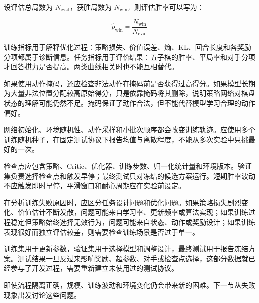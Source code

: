 \documentclass[UTF8,a4paper,zihao=-4,oneside,openany]{ctexbook}
\begin{document}
设评估总局数为 $N_{\mathrm{eval}}$，获胜局数为 $N_{\mathrm{win}}$，则评估胜率可以写为：

\begin{equation}
\widehat{p}_{\mathrm{win}}
=
\frac{
N_{\mathrm{win}}
}{
N_{\mathrm{eval}}
}
\end{equation}

训练指标用于解释优化过程：策略损失、价值误差、熵、KL、回合长度和各奖励分项都属于诊断信息。任务指标用于评价结果：五子棋的胜率、平局率和对手分项才回答棋力是否提高。两类曲线相关时也不能互相替代。

如果使用动作掩码，还应检查非法动作在掩码前是否获得过高得分。如果模型长期为大量非法位置分配较高原始得分，只是依靠掩码将其删除，说明策略网络对棋盘状态的理解可能仍然不足。掩码保证了动作合法，但不能代替模型学习合理的动作偏好。

网络初始化、环境随机性、动作采样和小批次顺序都会改变训练轨迹。应使用多个训练随机种子，在固定测试协议下报告均值与离散程度，不能从多次实验中只挑最好的一次。

检查点应包含策略、Critic、优化器、训练步数、归一化统计量和环境版本。验证集负责选择检查点和触发早停；最终测试只对冻结的候选方案运行。短期胜率波动不应触发即时早停，平滑窗口和耐心周期应在实验前设定。

在分析训练失败原因时，应区分任务设计问题和优化问题。如果策略损失剧烈变化、价值估计不断发散，问题可能来自学习率、更新频率或算法实现；如果训练过程稳定但策略始终选择无效行为，问题可能来自状态、动作或奖励设计；如果训练表现很好而独立评估较差，则需要检查训练场景是否过于单一。

训练集用于更新参数，验证集用于选择模型和调整设计，最终测试用于报告冻结方案。测试结果一旦反过来影响奖励、超参数、对手或检查点选择，这部分数据就已经参与了开发过程，需要重新建立未使用过的测试协议。

即使流程隔离正确，规模、训练波动和环境变化仍会带来新的困难。下一节从失败现象出发讨论这些问题。

\end{document}
